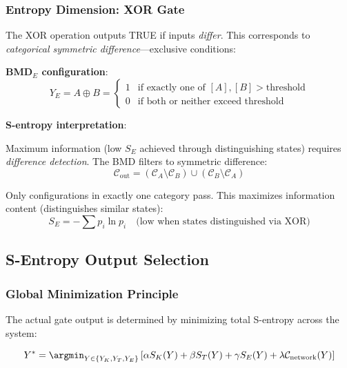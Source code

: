 \documentclass[11pt,a4paper]{article}
\begin{document}
\subsubsection{Entropy Dimension: XOR Gate}

The XOR operation outputs TRUE if inputs \textit{differ}. This corresponds to \textit{categorical symmetric difference}—exclusive conditions:

\textbf{BMD$_E$ configuration}:
\begin{equation}
Y_E = A \oplus B = \begin{cases}
1 & \text{if exactly one of } [A], [B] > \text{threshold} \\
0 & \text{if both or neither exceed threshold}
\end{cases}
\end{equation}

\textbf{S-entropy interpretation}:

Maximum information (low $S_E$ achieved through distinguishing states) requires \textit{difference detection}. The BMD filters to symmetric difference:
\begin{equation}
\mathcal{C}_{\text{out}} = (\mathcal{C}_A \setminus \mathcal{C}_B) \cup (\mathcal{C}_B \setminus \mathcal{C}_A)
\end{equation}

Only configurations in exactly one category pass. This maximizes information content (distinguishes similar states):
\begin{equation}
S_E = -\sum p_i \ln p_i \quad \text{(low when states distinguished via XOR)}
\end{equation}

\subsection{S-Entropy Output Selection}

\subsubsection{Global Minimization Principle}

The actual gate output is determined by minimizing total S-entropy across the system:

\begin{equation}
Y^* = \argmin_{Y \in \{Y_K, Y_T, Y_E\}} \left[\alpha S_K(Y) + \beta S_T(Y) + \gamma S_E(Y) + \lambda \mathcal{C}_{\text{network}}(Y)\right]
\end{equation}
\end{document}
